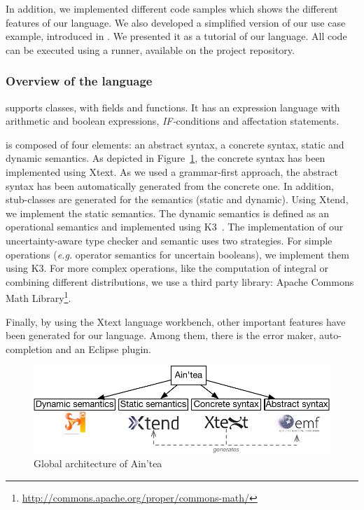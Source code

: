 In addition, we implemented different code samples which shows the different features of our language.%
We also developed a simplified version of our use case example, introduced in .
We presented it as a tutorial of our language.%
All code can be executed using a runner, available on the project repository.%

\subsubsection{Overview of the language}
\langName{} supports classes, with fields and functions.
It has an expression language with arithmetic and boolean expressions, \textit{IF-}conditions and affectation statements.

\langName{} is composed of four elements: an abstract syntax, a concrete syntax, static and dynamic semantics.
As depicted in Figure~\ref{fig:global-lang-arch}, the concrete syntax has been implemented using Xtext.
As we used a grammar-first approach, the abstract syntax has been automatically generated from the concrete one.
In addition, stub-classes are generated for the semantics (static and dynamic).
Using Xtend, we implement the static semantics.  
The dynamic semantics is defined as an operational semantics and implemented using K3~\cite{DBLP:journals/sosym/JezequelCBMF15}. 
The implementation of our uncertainty-aware type checker and semantic uses two strategies.
For simple operations (\textit{e.g.} operator semantics for uncertain booleans), we implement them using K3.
For more complex operations, like the computation of integral or combining different distributions, we use a third party library: Apache Commons Math Library\footnote{\url{http://commons.apache.org/proper/commons-math/}}.

Finally, by using the Xtext language workbench, other important features have been generated for our language.
Among them, there is the error maker, auto-completion and an Eclipse plugin.

\begin{figure}
	\centering
	\includegraphics[width=0.8\linewidth]{img/chapt-aintea/impl/global2}
	\caption{Global architecture of Ain'tea}
	\label{fig:global-lang-arch}
\end{figure}

